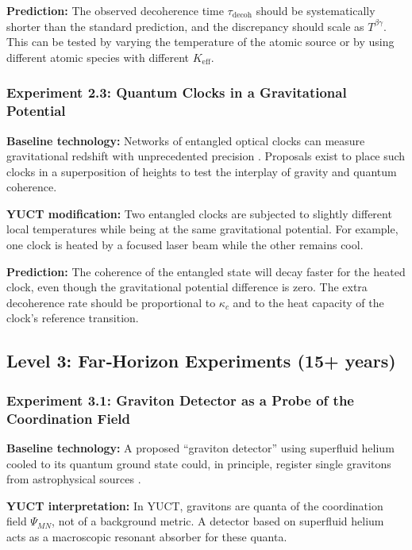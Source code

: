 \documentclass[12pt]{article}
\theoremstyle{remark}
\newcommand{\Keff}{K_{\mathrm{eff}}}
\begin{document}
	\textbf{Prediction:} The observed decoherence time \(\tau_{\mathrm{decoh}}\) should be systematically shorter
	than the standard prediction, and the discrepancy should scale as \(T^{\beta\gamma}\).  
	This can be tested by varying the temperature of the atomic source or by using different atomic species with
	different \(\Keff\).
	
	\subsubsection{Experiment 2.3: Quantum Clocks in a Gravitational Potential}
	
	\textbf{Baseline technology:} Networks of entangled optical clocks can measure gravitational redshift with
	unprecedented precision \cite{Katori2021}.  
	Proposals exist to place such clocks in a superposition of heights to test the interplay of gravity and quantum
	coherence.
	
	\textbf{YUCT modification:} Two entangled clocks are subjected to slightly different local temperatures while
	being at the same gravitational potential.  
	For example, one clock is heated by a focused laser beam while the other remains cool.
	
	\textbf{Prediction:} The coherence of the entangled state will decay faster for the heated clock, even though
	the gravitational potential difference is zero.  
	The extra decoherence rate should be proportional to \(\kappa_c\) and to the heat capacity of the clock’s
	reference transition.
	
	\subsection{Level 3: Far‑Horizon Experiments (15+ years)}
	\label{subsec:far-tests}
	
	\subsubsection{Experiment 3.1: Graviton Detector as a Probe of the Coordination Field}
	
	\textbf{Baseline technology:} A proposed “graviton detector” using superfluid helium cooled to its quantum ground
	state could, in principle, register single gravitons from astrophysical sources \cite{Berezin2025}.
	
	\textbf{YUCT interpretation:} In YUCT, gravitons are quanta of the coordination field \(\Psi_{MN}\), not of a
	background metric.  
	A detector based on superfluid helium acts as a macroscopic resonant absorber for these quanta.
	
\end{document}
